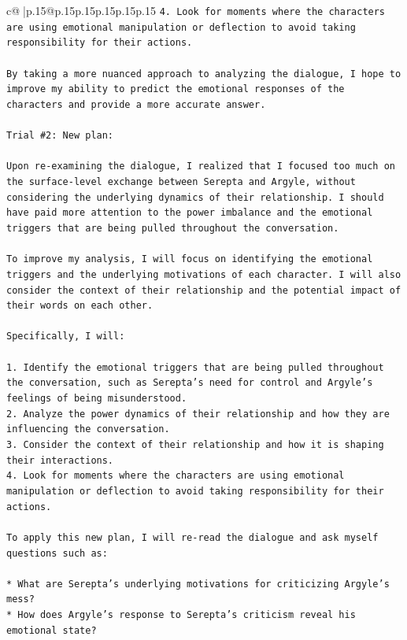 \documentclass{article}
\begin{document}
{\begin{supertabular}{c@{$\;$}|p{.15\linewidth}@{}p{.15\linewidth}p{.15\linewidth}p{.15\linewidth}p{.15\linewidth}p{.15\linewidth}}
{{{\texttt{4. Look for moments where the characters are using emotional manipulation or deflection to avoid taking responsibility for their actions.} \\
\\ 
\texttt{By taking a more nuanced approach to analyzing the dialogue, I hope to improve my ability to predict the emotional responses of the characters and provide a more accurate answer.} \\
\\ 
\texttt{Trial \#2: New plan: } \\
\\ 
\texttt{Upon re{-}examining the dialogue, I realized that I focused too much on the surface{-}level exchange between Serepta and Argyle, without considering the underlying dynamics of their relationship. I should have paid more attention to the power imbalance and the emotional triggers that are being pulled throughout the conversation.} \\
\\ 
\texttt{To improve my analysis, I will focus on identifying the emotional triggers and the underlying motivations of each character. I will also consider the context of their relationship and the potential impact of their words on each other.} \\
\\ 
\texttt{Specifically, I will:} \\
\\ 
\texttt{1. Identify the emotional triggers that are being pulled throughout the conversation, such as Serepta's need for control and Argyle's feelings of being misunderstood.} \\
\texttt{2. Analyze the power dynamics of their relationship and how they are influencing the conversation.} \\
\texttt{3. Consider the context of their relationship and how it is shaping their interactions.} \\
\texttt{4. Look for moments where the characters are using emotional manipulation or deflection to avoid taking responsibility for their actions.} \\
\\ 
\texttt{To apply this new plan, I will re{-}read the dialogue and ask myself questions such as:} \\
\\ 
\texttt{* What are Serepta's underlying motivations for criticizing Argyle's mess?} \\
\texttt{* How does Argyle's response to Serepta's criticism reveal his emotional state?} \\
}}}
\end{supertabular}}
\end{document}
